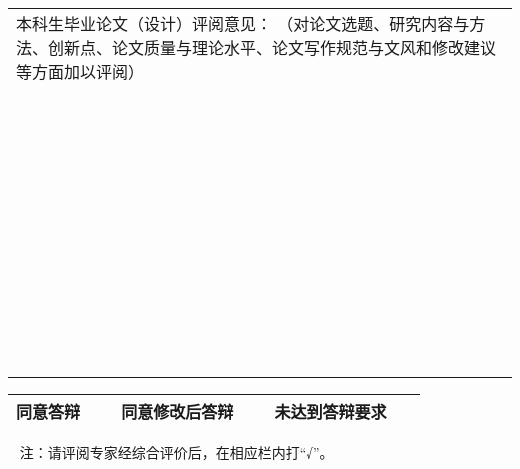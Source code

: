 {{\begin{center}
		{\renewcommand{\arraystretch}{1.5}
		\begin{tabularx}{\textwidth}{|X|}
			本科生毕业论文（设计）评阅意见：
			{\zihao{-5}（对论文选题、研究内容与方法、创新点、论文质量与理论水平、论文写作规范与文风和修改建议等方面加以评阅）} \\
			~                                                               \\
			~                                                               \\
			~                                                               \\
			~                                                               \\
			~                                                               \\
			~                                                               \\
			~                                                               \\
			~                                                               \\
			~                                                               \\
			~                                                               \\
			\hline
		\end{tabularx}}

		\begin{tabularx}{\textwidth}{|p{2.54cm}|X|p{3.49cm}|X|p{3.49cm}|X|}
			同意答辩 & ~ & 同意修改后答辩 & ~ & 未达到答辩要求 & ~ \\ \hline
		\end{tabularx}
	\end{center}

	\par ~
	\vfill
	{ 注：请评阅专家经综合评价后，在相应栏内打“√”。}
}
}
